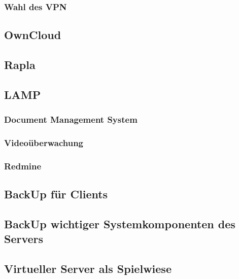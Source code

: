 \subsubsection{Wahl des VPN}

\subsection{OwnCloud}

\subsection{Rapla}

\subsection{LAMP}
\subsubsection{Document Management System}

\subsubsection{Videoüberwachung}

\subsubsection{Redmine}

\subsection{BackUp für Clients}

\subsection{BackUp wichtiger Systemkomponenten des Servers}

\subsection{Virtueller Server als Spielwiese}
